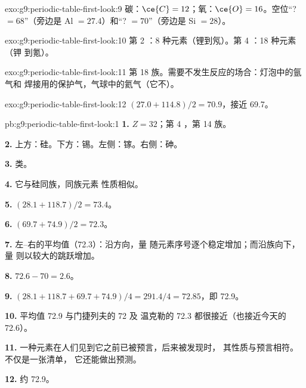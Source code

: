 \begin{solution}{exo:g9:periodic-table-first-look:9}
碳：$\ce{C} = 12$；氧：$\ce{O} = 16$。空位“? $= 68$”（旁边是
Al $= 27.4$）和“? $= 70$”（旁边是 Si $= 28$）。
\end{solution}

\begin{solution}{exo:g9:periodic-table-first-look:10}
第 2 ：8 种元素（锂到氖）。第 4 ：18 种元素（钾
到氪）。
\end{solution}

\begin{solution}{exo:g9:periodic-table-first-look:11}
第 18 族。需要不发生反应的场合：灯泡中的氩气和
焊接用的保护气，气球中的氦气（它不）。
\end{solution}

\begin{solution}{exo:g9:periodic-table-first-look:12}
$(27.0 + 114.8)/2 = 70.9$，接近 69.7。
\end{solution}

\begin{solution}{pb:g9:periodic-table-first-look:1}
\textbf{1.} $Z = 32$；第 4 ，第 14 族。

\textbf{2.} 上方：硅。下方：锡。左侧：镓。右侧：砷。

\textbf{3.} 类。

\textbf{4.} 它与硅同族，同族元素
性质相似。

\textbf{5.} $(28.1 + 118.7)/2 = 73.4$。

\textbf{6.} $(69.7 + 74.9)/2 = 72.3$。

\textbf{7.} 左–右的平均值（72.3）：沿方向，量
随元素序号逐个稳定增加；而沿族向下，量
则以较大的跳跃增加。

\textbf{8.} $72.6 - 70 = 2.6$。

\textbf{9.} $(28.1 + 118.7 + 69.7 + 74.9)/4 = 291.4/4 = 72.85$，即
72.9。

\textbf{10.} 平均值 72.9 与门捷列夫的 72 及
温克勒的 72.3 都很接近（也接近今天的 72.6）。

\textbf{11.} 一种元素在人们见到它之前已被预言，后来被发现时，
其性质与预言相符。不仅是一张清单，
它还能做出预测。

\textbf{12.} 约 72.9。
\end{solution}
